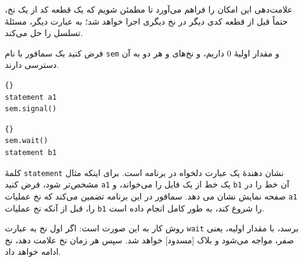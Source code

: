 \documentclass{book}
\begin{document}
علامت‌دهی این امکان را فراهم می‌آورد تا مطمئن شویم که یک قطعه کد از یک نخ، حتماً قبل از قطعه کدی دیگر در نخ دیگری اجرا خواهد شد؛ به عبارت دیگر، مسئلهٔ تسلسل را حل می‌کند.

فرض کنید یک سمافور با نام \texttt{sem} و مقدار اولیهٔ  $0$ داریم، و نخ‌های  و  هر دو به آن دسترسی دارند.

\begin{latin}
\begin{minipage}[t]{2in}
\begin{latin}
\begin{lstlisting}[title=\rl{نخ \lr{A}}]{}
statement a1
sem.signal()
\end{lstlisting}
\end{latin}
\end{minipage}
\hfill
\begin{minipage}[t]{2in}
\begin{latin}
\begin{lstlisting}[title=\rl{نخ \lr{B}}]{}
sem.wait()
statement b1
\end{lstlisting}
\end{latin}
\end{minipage}
\end{latin}

کلمهٔ \texttt{statement} نشان دهندهٔ یک عبارت دلخواه در برنامه است. برای اینکه مثال مشخص‌تر شود، فرض کنید \texttt{a1}
یک خط از یک فایل را می‌خواند، و \texttt{b1} آن خط را در صفحه نمایش نشان می دهد. سمافور در این برنامه تضمین می‌کند که 
نخ  عملیات \texttt{a1} را، قبل از آنکه نخ  عملیات \texttt{b1} را شروع کند، به طور کامل انجام داده است.

روش کار به این صورت است: اگر اول نخ  به عبارت \texttt{wait} برسد، با مقدار اولیه، یعنی صفر، مواجه می‌شود 
و بلاک [مسدود] خواهد شد. سپس هر زمان نخ  علامت دهد، نخ  ادامه خواهد داد.
\end{document}
